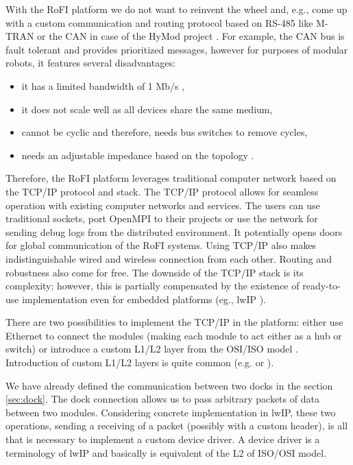 With the RoFI platform we do not want to reinvent the wheel and, e.g., come up
with a custom communication and routing protocol based on RS-485 like M-TRAN or
the CAN in case of the HyMod project \cite{parrott_hymod:_2016}. For example,
the CAN bus is fault tolerant and provides prioritized messages, however for
purposes of modular robots, it features several disadvantages:
\begin{itemize}
    \item it has a limited bandwidth of 1 Mb/s \cite{noauthor_road_2013},
    \item it does not scale well as all devices share the same medium,
    \item cannot be cyclic and therefore, needs bus switches to remove cycles,
    \item needs an adjustable impedance based on the topology
    \cite{parrott_hymod:_2016}.
\end{itemize}

Therefore, the RoFI platform leverages traditional computer network based on the
TCP/IP protocol and stack. The TCP/IP protocol allows for seamless operation
with existing computer networks and services. The users can use traditional
sockets, port OpenMPI to their projects or use the network for sending debug
logs from the distributed environment. It potentially opens doors for global
communication of the RoFI systems. Using TCP/IP also makes indistinguishable
wired and wireless connection from each other. Routing and robustness also come
for free. The downside of the TCP/IP stack is its complexity; however, this is
partially compensated by the existence of ready-to-use implementation even for
embedded platforms (eg., lwIP \cite{noauthor_lwip_nodate}).

There are two possibilities to implement the TCP/IP in the platform: either use
Ethernet to connect the modules (making each module to act either as a hub or
switch) or introduce a custom L1/L2 layer from the OSI/ISO model
\cite{braden_requirements_1989}. Introduction of custom L1/L2 layers is quite
common (e.g. \cite{lindgren_ip_2008} or \cite{waitzman_ip_1999}).

We have already defined the communication between two docks in the section
\ref{sec:dock}. The dock connection allows us to pass arbitrary packets of data
between two modules. Considering concrete implementation in lwIP, these two
operations, sending a receiving of a packet (possibly with a custom header), is
all that is necessary to implement a custom device driver. A device driver is a
terminology of lwIP and basically is equivalent of the L2 of ISO/OSI model.

